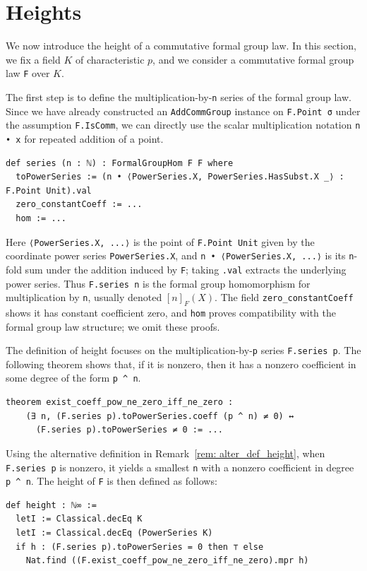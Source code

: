 \section{Heights}

We now introduce the height of a commutative formal group law.  In this
section, we fix a field $K$ of characteristic $p$, and we consider a
commutative formal group law \lstinline|F| over $K$.

The first step is to define the multiplication-by-\lstinline|n| series of
the formal group law.  Since we have already constructed an
\lstinline|AddCommGroup| instance on \lstinline|F.Point σ| under the
assumption \lstinline|F.IsComm|, we can directly use the scalar
multiplication notation \lstinline|n • x| for repeated addition of a
point.

\begin{lstlisting}
def series (n : ℕ) : FormalGroupHom F F where
  toPowerSeries := (n • ⟨PowerSeries.X, PowerSeries.HasSubst.X _⟩ : F.Point Unit).val
  zero_constantCoeff := ...
  hom := ...
\end{lstlisting}

Here \lstinline|⟨PowerSeries.X, ...⟩| is the point of
\lstinline|F.Point Unit| given by the coordinate power series
\lstinline|PowerSeries.X|, and \lstinline|n • ⟨PowerSeries.X, ...⟩| is its
\lstinline|n|-fold sum under the addition induced by \lstinline|F|; taking
\lstinline|.val| extracts the underlying power series.  Thus
\lstinline|F.series n| is the formal group homomorphism for multiplication
by \lstinline|n|, usually denoted $[n]_F(X)$.  The field
\lstinline|zero_constantCoeff| shows it has constant coefficient zero, and
\lstinline|hom| proves compatibility with the formal group law structure;
we omit these proofs.

The definition of height focuses on the multiplication-by-\lstinline|p|
series \lstinline|F.series p|.  The following theorem shows that, if it is
nonzero, then it has a nonzero coefficient in some degree of the form
\lstinline|p ^ n|.

\begin{lstlisting}
theorem exist_coeff_pow_ne_zero_iff_ne_zero :
    (∃ n, (F.series p).toPowerSeries.coeff (p ^ n) ≠ 0) ↔
      (F.series p).toPowerSeries ≠ 0 := ...
\end{lstlisting}

Using the alternative definition in Remark~\ref{rem: alter_def_height}, when \lstinline|F.series p| is nonzero, it
yields a smallest \lstinline|n| with a nonzero coefficient in degree
\lstinline|p ^ n|. The height of \lstinline|F| is then defined as follows:
\begin{lstlisting}
def height : ℕ∞ :=
  letI := Classical.decEq K
  letI := Classical.decEq (PowerSeries K)
  if h : (F.series p).toPowerSeries = 0 then ⊤ else
    Nat.find ((F.exist_coeff_pow_ne_zero_iff_ne_zero).mpr h)
\end{lstlisting}


